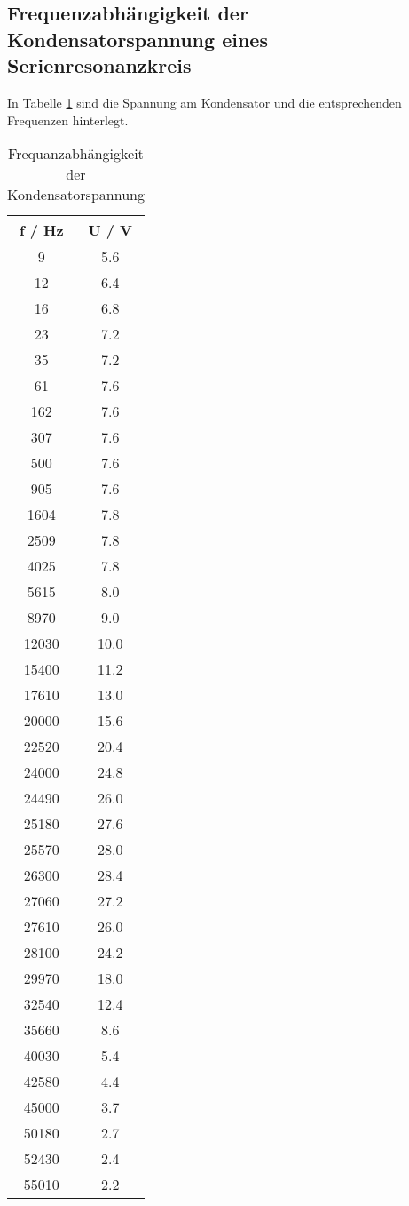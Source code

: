 \subsection{Frequenzabhängigkeit der Kondensatorspannung eines  Serienresonanzkreis}
In Tabelle \ref{tab:U_c} sind die Spannung am Kondensator und die entsprechenden Frequenzen hinterlegt.
\begin{table}
  \centering
  \begin{tabular}{c c}
	\toprule
	f / Hz & U / V \\
	\midrule
	9	& 5.6	\\
	12	& 6.4	\\
	16	& 6.8	\\
	23	& 7.2	\\
	35	& 7.2	\\
	61	& 7.6	\\
	162	& 7.6	\\
	307	& 7.6	\\
	500	& 7.6	\\
	905	& 7.6	\\
	1604	& 7.8	\\
	2509	& 7.8	\\
	4025	& 7.8	\\
	5615	& 8.0	\\
	8970	& 9.0	\\
 	12030	& 10.0	\\
 	15400	& 11.2	\\
 	17610	& 13.0	\\
 	20000	& 15.6	\\
 	22520	& 20.4	\\
 	24000	& 24.8	\\
	24490	& 26.0	\\
	25180	& 27.6	\\
	25570	& 28.0	\\
	26300	& 28.4	\\
	27060	& 27.2	\\
 	27610	& 26.0	\\
 	28100	& 24.2	\\
 	29970	& 18.0	\\
 	32540	& 12.4	\\
	35660	& 8.6	\\
	40030 	& 5.4	\\
	42580 	& 4.4	\\
	45000	& 3.7	\\
	50180	& 2.7	\\
	52430 	& 2.4	\\
	55010	& 2.2	\\
	\bottomrule
 	\end{tabular}
  \caption{Frequanzabhängigkeit der Kondensatorspannung}
  \label{tab:U_c}
\end{table}

